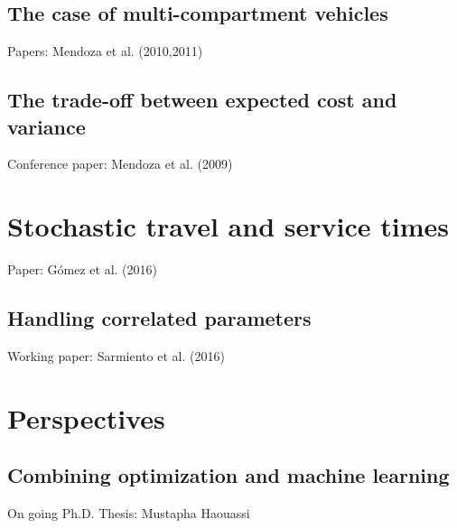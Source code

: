 \subsection{The case of multi-compartment vehicles}
	Papers: Mendoza et al. (2010,2011)
\subsection{The trade-off between expected cost and variance}
	Conference paper: Mendoza et al. (2009)
\section{Stochastic travel and service times}
  	Paper: Gómez et al. (2016)
\subsection{Handling correlated parameters}
  	Working paper: Sarmiento et al. (2016)
\section{Perspectives}
  	\subsection{Combining optimization and machine learning}
  	On going Ph.D. Thesis: Mustapha Haouassi
